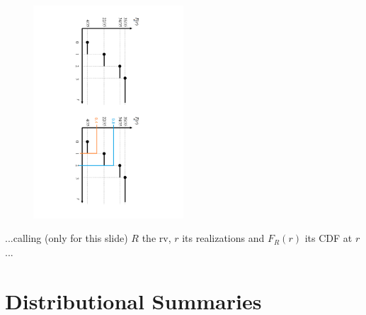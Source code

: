 \documentclass[smaller, handout]{beamer}\usepackage[]{graphicx}\usepackage[]{color}
\begin{document}
\begin{frame}{\secname}
\begin{example}
  \begin{figure}[h!]
  \centering
  \includegraphics[width=0.5\textwidth,height=0.95\textheight, angle = 90]{img/Quantiles_Discr.pdf}
  \end{figure}
  ...calling (only for this slide) $R$ the rv, $r$ its realizations and $F_R(r)$ its CDF at $r$...
  \end{example}
\end{frame}

\section{Distributional Summaries}
\end{document}
